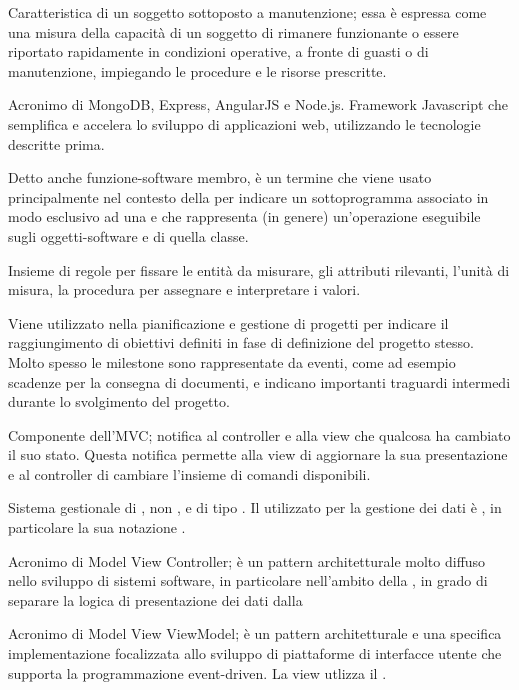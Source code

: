{Caratteristica di un soggetto sottoposto a manutenzione; essa è espressa come una misura della capacità di un soggetto di rimanere funzionante o essere riportato rapidamente in condizioni operative, a fronte di guasti o di manutenzione, impiegando le procedure e le risorse prescritte. }

{Acronimo di MongoDB, Express, AngularJS e Node.js. Framework Javascript che semplifica e accelera lo sviluppo di applicazioni web, utilizzando le tecnologie descritte prima.}

{Detto anche funzione-software membro, è un termine che viene usato principalmente nel contesto della   per indicare un sottoprogramma associato in modo esclusivo ad una  e che rappresenta (in genere) un'operazione eseguibile sugli oggetti-software e  di quella classe.}

{Insieme di regole per fissare le entità da misurare, gli attributi rilevanti, l'unità di misura, la procedura per assegnare e interpretare i valori.}

{Viene utilizzato nella pianificazione e gestione di progetti per indicare il raggiungimento di obiettivi definiti in fase di definizione del progetto stesso. Molto spesso le milestone sono rappresentate da eventi, come ad esempio scadenze per la consegna di documenti, e indicano importanti traguardi intermedi durante lo svolgimento del progetto.}

{Componente dell'MVC; notifica al controller e alla view che qualcosa ha cambiato il suo stato. Questa notifica permette alla view di aggiornare la sua presentazione e al controller di cambiare l'insieme di comandi disponibili.}

{Sistema gestionale di , non ,  e di tipo . Il  utilizzato per la gestione dei dati è , in particolare la sua notazione .}

{Acronimo di Model View Controller; è un pattern architetturale molto diffuso nello sviluppo di sistemi software, in particolare nell'ambito della , in grado di separare la logica di presentazione dei dati dalla }

{Acronimo di Model View ViewModel; è un pattern architetturale e una specifica implementazione focalizzata allo sviluppo di piattaforme di interfacce utente che supporta la programmazione event-driven. La view utlizza il .}

